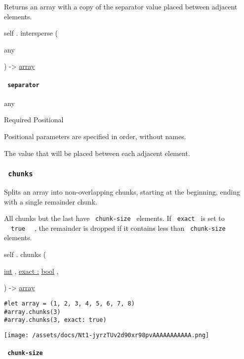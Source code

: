 Returns an array with a copy of the separator value placed between
adjacent elements.

self { . } { intersperse } (

{ { any } }

) -\textgreater{} \href{/docs/reference/foundations/array/}{array}

\paragraph{\texorpdfstring{\texttt{\ separator\ }}{ separator }}\label{definitions-intersperse-separator}

{ any }

{Required} {{ Positional }}

\label{definitions-intersperse-separator-positional-tooltip}
Positional parameters are specified in order, without names.

The value that will be placed between each adjacent element.

\subsubsection{\texorpdfstring{\texttt{\ chunks\ }}{ chunks }}\label{definitions-chunks}

Splits an array into non-overlapping chunks, starting at the beginning,
ending with a single remainder chunk.

All chunks but the last have \texttt{\ chunk-size\ } elements. If
\texttt{\ exact\ } is set to \texttt{\ }{\texttt{\ true\ }}\texttt{\ } ,
the remainder is dropped if it contains less than
\texttt{\ chunk-size\ } elements.

self { . } { chunks } (

{ \href{/docs/reference/foundations/int/}{int} , } {
\hyperref[definitions-chunks-parameters-exact]{exact :}
\href{/docs/reference/foundations/bool/}{bool} , }

) -\textgreater{} \href{/docs/reference/foundations/array/}{array}

\begin{verbatim}
#let array = (1, 2, 3, 4, 5, 6, 7, 8)
#array.chunks(3)
#array.chunks(3, exact: true)
\end{verbatim}

\texttt{[image: /assets/docs/Nt1-jyrzTUv2d90xr98pvAAAAAAAAAAA.png]}

\paragraph{\texorpdfstring{\texttt{\ chunk-size\ }}{ chunk-size }}\label{definitions-chunks-chunk-size}

